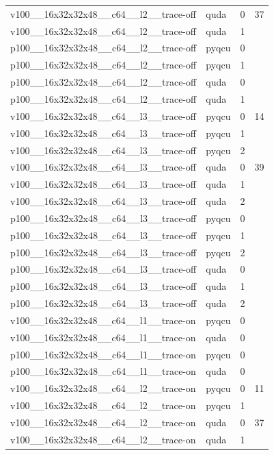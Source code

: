 \begin{table}[htbp]
\begin{tabular}{@{}llrr@{}}
v100\_\_16x32x32x48\_\_c64\_\_l2\_\_trace-off & quda & 0 & 37 \\
v100\_\_16x32x32x48\_\_c64\_\_l2\_\_trace-off & quda & 1 &  \\
p100\_\_16x32x32x48\_\_c64\_\_l2\_\_trace-off & pyqcu & 0 &  \\
p100\_\_16x32x32x48\_\_c64\_\_l2\_\_trace-off & pyqcu & 1 &  \\
p100\_\_16x32x32x48\_\_c64\_\_l2\_\_trace-off & quda & 0 &  \\
p100\_\_16x32x32x48\_\_c64\_\_l2\_\_trace-off & quda & 1 &  \\
v100\_\_16x32x32x48\_\_c64\_\_l3\_\_trace-off & pyqcu & 0 & 14 \\
v100\_\_16x32x32x48\_\_c64\_\_l3\_\_trace-off & pyqcu & 1 &  \\
v100\_\_16x32x32x48\_\_c64\_\_l3\_\_trace-off & pyqcu & 2 &  \\
v100\_\_16x32x32x48\_\_c64\_\_l3\_\_trace-off & quda & 0 & 39 \\
v100\_\_16x32x32x48\_\_c64\_\_l3\_\_trace-off & quda & 1 &  \\
v100\_\_16x32x32x48\_\_c64\_\_l3\_\_trace-off & quda & 2 &  \\
p100\_\_16x32x32x48\_\_c64\_\_l3\_\_trace-off & pyqcu & 0 &  \\
p100\_\_16x32x32x48\_\_c64\_\_l3\_\_trace-off & pyqcu & 1 &  \\
p100\_\_16x32x32x48\_\_c64\_\_l3\_\_trace-off & pyqcu & 2 &  \\
p100\_\_16x32x32x48\_\_c64\_\_l3\_\_trace-off & quda & 0 &  \\
p100\_\_16x32x32x48\_\_c64\_\_l3\_\_trace-off & quda & 1 &  \\
p100\_\_16x32x32x48\_\_c64\_\_l3\_\_trace-off & quda & 2 &  \\
v100\_\_16x32x32x48\_\_c64\_\_l1\_\_trace-on & pyqcu & 0 &  \\
v100\_\_16x32x32x48\_\_c64\_\_l1\_\_trace-on & quda & 0 &  \\
p100\_\_16x32x32x48\_\_c64\_\_l1\_\_trace-on & pyqcu & 0 &  \\
p100\_\_16x32x32x48\_\_c64\_\_l1\_\_trace-on & quda & 0 &  \\
v100\_\_16x32x32x48\_\_c64\_\_l2\_\_trace-on & pyqcu & 0 & 11 \\
v100\_\_16x32x32x48\_\_c64\_\_l2\_\_trace-on & pyqcu & 1 &  \\
v100\_\_16x32x32x48\_\_c64\_\_l2\_\_trace-on & quda & 0 & 37 \\
v100\_\_16x32x32x48\_\_c64\_\_l2\_\_trace-on & quda & 1 &  \\

\end{tabular}
\end{table}
